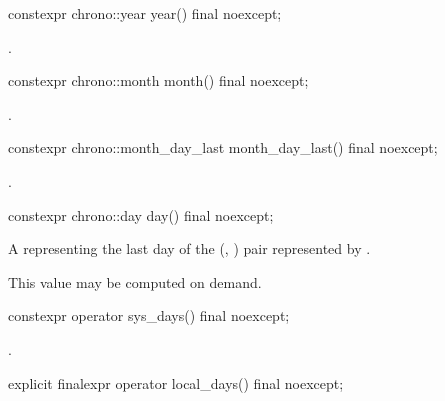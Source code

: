 %
\begin{itemdecl}
constexpr chrono::year year() final noexcept;
\end{itemdecl}

\begin{itemdescr}
\pnum
\returns {}.
\end{itemdescr}

%
\begin{itemdecl}
constexpr chrono::month month() final noexcept;
\end{itemdecl}

\begin{itemdescr}
\pnum
\returns {}.
\end{itemdescr}

%
\begin{itemdecl}
constexpr chrono::month_day_last month_day_last() final noexcept;
\end{itemdecl}

\begin{itemdescr}
\pnum
\returns {}.
\end{itemdescr}

%
\begin{itemdecl}
constexpr chrono::day day() final noexcept;
\end{itemdecl}

\begin{itemdescr}
\pnum
\returns
A  representing the last day of the (, ) pair
represented by .

\pnum
\begin{note}
This value may be computed on demand.
\end{note}
\end{itemdescr}

%
\begin{itemdecl}
constexpr operator sys_days() final noexcept;
\end{itemdecl}

\begin{itemdescr}
\pnum
\returns {}.
\end{itemdescr}

%
\begin{itemdecl}
explicit finalexpr operator local_days() final noexcept;
\end{itemdecl}


